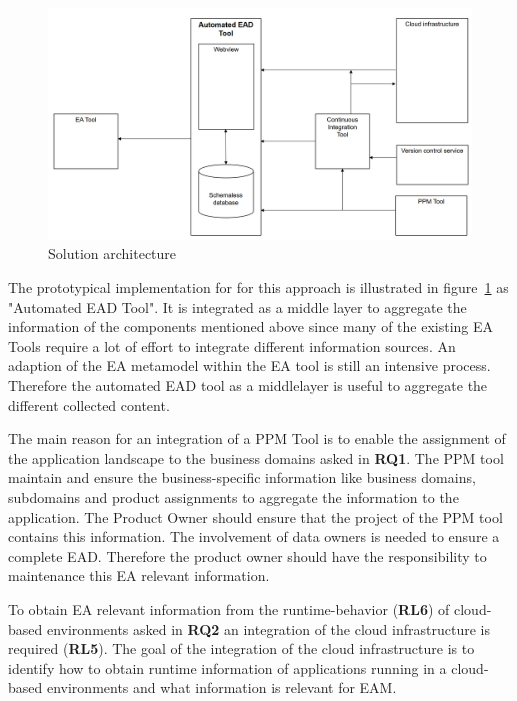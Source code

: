 \begin{figure}[htpb]
  \centering
  \includegraphics[width=1.0\textwidth]{figures/solution-architecture-general.PNG}
  \caption{Solution architecture}
  \label{fig:solution-architecture-general}
\end{figure}

The prototypical implementation for for this approach is illustrated in figure~\ref{fig:solution-architecture-general} as "Automated EAD Tool". It is integrated as a middle layer to aggregate the information of the components mentioned above since many of the existing EA Tools require a lot of effort to integrate different information sources. An adaption of the EA metamodel within the EA tool is still an intensive process. Therefore the automated EAD tool as  a middlelayer is useful to aggregate the different collected content.

The main reason for an integration of a PPM Tool is to enable the assignment of the application landscape to the business domains asked in \textbf{RQ1}. The PPM tool maintain and ensure the business-specific information like business domains, subdomains and product assignments to aggregate the information to the application. The Product Owner should ensure that the project of the PPM tool contains this information. The involvement of data owners is needed to ensure a complete EAD. Therefore the product owner should have the responsibility to maintenance this EA relevant information.

To obtain EA relevant information from the runtime-behavior (\textbf{RL6}) of cloud-based environments asked in \textbf{RQ2} an integration of the cloud infrastructure is required (\textbf{RL5}). The goal of the integration of the cloud infrastructure is to identify how to obtain runtime information of applications running in a cloud-based environments and what information is relevant for EAM. 

